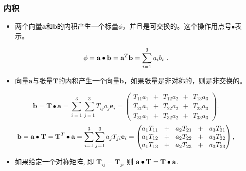 \documentclass[MathematicsNumericsDerivationsAndOpenFOAM.tex]{subfiles}
\begin{document}
\subsubsection{内积}
%
%
\begin{itemize}
    \item 两个向量$\textbf{a}$和$\textbf{b}$的内积产生一个标量$\phi$，并且是可交换的。这个操作用点号$\bullet$表示。
\end{itemize}
%
%
\begin{equation}
 \phi = \textbf{a} \bullet \textbf{b} = \textbf{a} ^T \textbf{b} = \sum_{i=1}^{3} a_i b_i ~.
 \label{EQUATION::innerProductVV}
\end{equation}
%
%
%
\begin{itemize}
    \item  向量$\textbf{a}$与张量$\textbf{T}$的内积产生一个向量$\textbf{b}$，如果张量是非对称的，则是非交换的。
\end{itemize}
%
%
\begin{equation}
 \textbf{b} = \textbf{T} \bullet \textbf{a} =
 \sum_{i=1}^{3}\sum_{j=1}^{3} T_{ij} a_j   \textbf{e}_i
 =
  \left(
  \begin{matrix}
   T_{11} a_1 ~ ~ + ~ ~ T_{12} a_2 ~ ~ + ~ ~ T_{13} a_3 \\
   T_{21} a_1 ~ ~ + ~ ~ T_{22} a_2 ~ ~ + ~ ~ T_{23} a_3 \\
   T_{31} a_1 ~ ~ + ~ ~ T_{32} a_2 ~ ~ + ~ ~ T_{33} a_3
  \end{matrix}
  \right).
  \label{EQUATION::innerProductTV}
\end{equation}
%
%
\begin{equation}
 \textbf{b} = \textbf{a} \bullet \textbf{T}
 =
 \textbf{T} ^T \bullet \textbf{a}
 =
 \sum_{i=1}^{3}\sum_{j=1}^{3} a_j T_{ji}  \textbf{e}_i
 =
  \left(
  \begin{matrix}
   a_1 T_{11} ~ ~ + ~ ~ a_2 T_{21} ~ ~ + ~ ~ a_3 T_{31} \\
   a_1 T_{12} ~ ~ + ~ ~ a_2 T_{22} ~ ~ + ~ ~ a_3 T_{32} \\
   a_1 T_{13} ~ ~ + ~ ~ a_2 T_{23} ~ ~ + ~ ~ a_3 T_{33}
  \end{matrix}
  \right),
  \label{EQUATION::innerProductVT}
\end{equation}
%
%
\begin{itemize}
   \item[] 如果给定一个对称矩阵, 即 $\textbf{T}_{ij} = \textbf{T}_{ji}$
   则 $\textbf{a}\bullet\textbf{T} = \textbf{T} \bullet \textbf{a}$.
\end{itemize}
%
%
%
%
%
%
%
%
\end{document}
